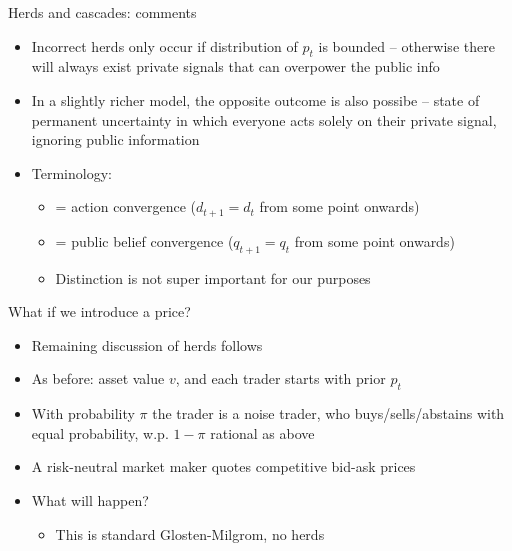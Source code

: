 \documentclass[english,10pt
,aspectratio=169
]{beamer}
\begin{document}
\begin{frame}{Herds and cascades: comments}
	\begin{itemize}
		\item Incorrect herds only occur if distribution of $p_t$ is bounded -- otherwise there will always exist private signals that can overpower the public info
		\item In a slightly richer model, the opposite outcome is also possibe -- state of permanent uncertainty in which everyone acts solely on their private signal, ignoring public information
		\item Terminology:
		\begin{itemize}
			\item {} = action convergence ($d_{t+1} = d_t$ from some point onwards)
			\item {} = public belief convergence ($q_{t+1} = q_t$ from some point onwards)
			\item Distinction is not super important for our purposes
		\end{itemize}
	\end{itemize}
\end{frame}


\begin{frame}{What if we introduce a price?}
	\begin{itemize}
		\item Remaining discussion of herds follows \cite{bikhchandani_herd_2000}
		\item As before: asset value $v$, and each trader starts with prior $p_t$
		\item With probability $\pi$ the trader is a noise trader, who buys/sells/abstains with equal probability, w.p. $1-\pi$ rational as above
		\item A risk-neutral market maker quotes competitive bid-ask prices
		\item What will happen?
		\begin{itemize}
			\pause[3]
			\item This is standard Glosten-Milgrom, no herds
		\end{itemize}
	\end{itemize}
\end{frame}
\end{document}
